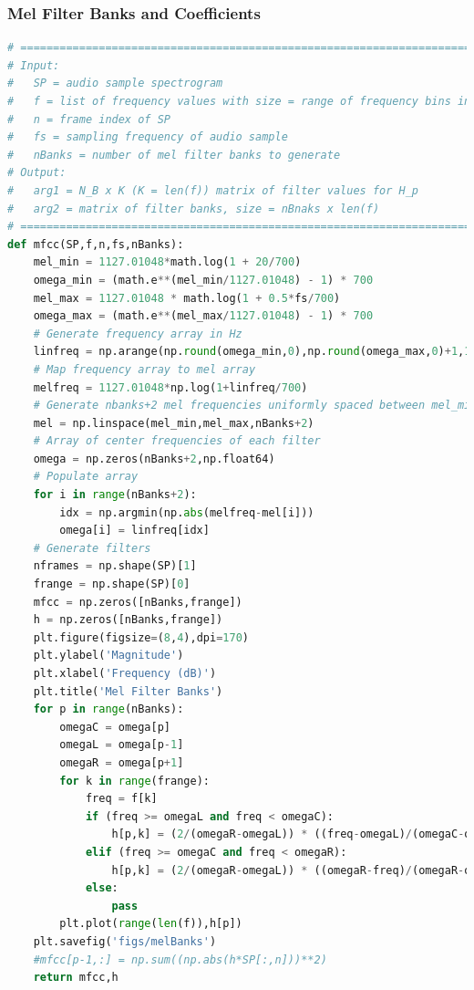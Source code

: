 \documentclass[11pt,a4paper]{article}
\begin{document}
	\subsubsection{Mel Filter Banks and Coefficients} \label{app:mfcc}
		\begin{lstlisting}[language=Python,label={lst:mfcc}]
# =============================================================================
# Input:
#   SP = audio sample spectrogram
#   f = list of frequency values with size = range of frequency bins in SP
#   n = frame index of SP
#   fs = sampling frequency of audio sample
#   nBanks = number of mel filter banks to generate
# Output:
#   arg1 = N_B x K (K = len(f)) matrix of filter values for H_p
#   arg2 = matrix of filter banks, size = nBnaks x len(f)
# =============================================================================
def mfcc(SP,f,n,fs,nBanks):
    mel_min = 1127.01048*math.log(1 + 20/700)
    omega_min = (math.e**(mel_min/1127.01048) - 1) * 700
    mel_max = 1127.01048 * math.log(1 + 0.5*fs/700)
    omega_max = (math.e**(mel_max/1127.01048) - 1) * 700
    # Generate frequency array in Hz
    linfreq = np.arange(np.round(omega_min,0),np.round(omega_max,0)+1,1)
    # Map frequency array to mel array
    melfreq = 1127.01048*np.log(1+linfreq/700)
    # Generate nbanks+2 mel frequencies uniformly spaced between mel_min and mel_max, inclusive
    mel = np.linspace(mel_min,mel_max,nBanks+2)
    # Array of center frequencies of each filter
    omega = np.zeros(nBanks+2,np.float64)
    # Populate array
    for i in range(nBanks+2):
        idx = np.argmin(np.abs(melfreq-mel[i]))
        omega[i] = linfreq[idx]
    # Generate filters
    nframes = np.shape(SP)[1]
    frange = np.shape(SP)[0]
    mfcc = np.zeros([nBanks,frange])
    h = np.zeros([nBanks,frange])
    plt.figure(figsize=(8,4),dpi=170)
    plt.ylabel('Magnitude')
    plt.xlabel('Frequency (dB)')
    plt.title('Mel Filter Banks')
    for p in range(nBanks):
        omegaC = omega[p]
        omegaL = omega[p-1]
        omegaR = omega[p+1]
        for k in range(frange):
            freq = f[k]
            if (freq >= omegaL and freq < omegaC):
                h[p,k] = (2/(omegaR-omegaL)) * ((freq-omegaL)/(omegaC-omegaL))
            elif (freq >= omegaC and freq < omegaR):
                h[p,k] = (2/(omegaR-omegaL)) * ((omegaR-freq)/(omegaR-omegaC))
            else:
                pass
        plt.plot(range(len(f)),h[p])
    plt.savefig('figs/melBanks')
    #mfcc[p-1,:] = np.sum((np.abs(h*SP[:,n]))**2)
    return mfcc,h
		\end{lstlisting}
\end{document}
